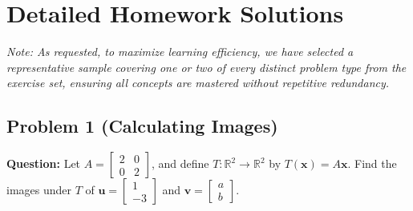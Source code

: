 \documentclass[11pt]{article}
\begin{document}
\section{Detailed Homework Solutions}
\textit{Note: As requested, to maximize learning efficiency, we have selected a representative sample covering one or two of every distinct problem type from the exercise set, ensuring all concepts are mastered without repetitive redundancy.}

\subsection{Problem 1 (Calculating Images)}
\textbf{Question:} Let $A = \begin{bmatrix} 2 & 0 \\ 0 & 2 \end{bmatrix}$, and define $T: \mathbb{R}^2 \to \mathbb{R}^2$ by $T(\mathbf{x}) = A\mathbf{x}$. Find the images under $T$ of $\mathbf{u} = \begin{bmatrix} 1 \\ -3 \end{bmatrix}$ and $\mathbf{v} = \begin{bmatrix} a \\ b \end{bmatrix}$.
\end{document}
